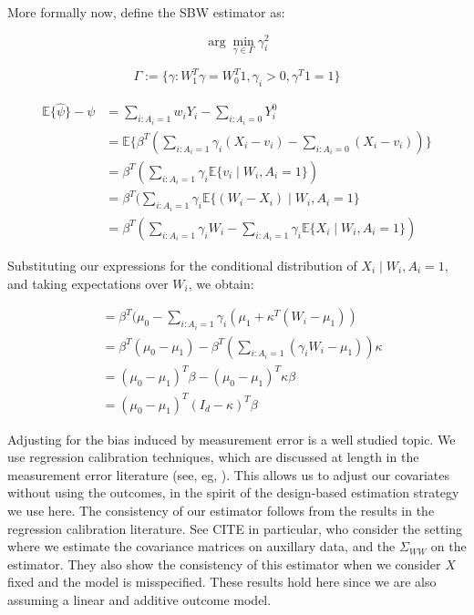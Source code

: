 \documentclass[12pt]{article}
\begin{document}
More formally now, define the SBW estimator as:

$$
\arg\min_{\gamma \in \Gamma} \gamma_i^2
$$

$$
\Gamma := \{\gamma: W_1^T\gamma = W_0^T1, \gamma_i > 0, \gamma^T1 = 1\}
$$

\begin{align*}
    \mathbb{E}\{\hat{\psi}\} - \psi &= \sum_{i: A_i = 1}w_iY_i - \sum_{i: A_i = 0}Y_i^0 \\
    &= \mathbb{E}\{\beta^T(\sum_{i: A_i = 1} \gamma_i (X_i - v_i) - \sum_{i: A_i = 0} (X_i - v_i))\} \\
    &= \beta^T(\sum_{i: A_i = 1} \gamma_i\mathbb{E}\{v_i \mid W_i, A_i = 1\}) \\
    &= \beta^T(\sum_{i: A_i = 1} \gamma_i\mathbb{E}\{(W_i - X_i) \mid W_i, A_i = 1\} \\
    &= \beta^T(\sum_{i: A_i = 1} \gamma_iW_i - \sum_{i: A_i = 1} \gamma_i\mathbb{E}\{X_i \mid W_i, A_i = 1\})
\end{align*}

Substituting our expressions for the conditional distribution of $X_i \mid W_i, A_i = 1$, and taking expectations over $W_i$, we obtain:

\begin{align*}
    &= \beta^T(\mu_0 - \sum_{i: A_i = 1} \gamma_i(\mu_1 + \kappa^T(W_i - \mu_1)) \\
    &= \beta^T(\mu_0 - \mu_1) - \beta^T(\sum_{i: A_i = 1}(\gamma_iW_i - \mu_1))\kappa \\
    &= (\mu_0 - \mu_1)^T\beta - (\mu_0 - \mu_1)^T\kappa\beta \\
    &= (\mu_0 - \mu_1)^T(I_d - \kappa)^T\beta
\end{align*}

Adjusting for the bias induced by measurement error is a well studied topic. We use regression calibration techniques, which are discussed at length in the measurement error literature (see, eg, \cite{carroll2006measurement}). This allows us to adjust our covariates without using the outcomes, in the spirit of the design-based estimation strategy we use here. The consistency of our estimator follows from the results in the regression calibration literature. See CITE in particular, who consider the setting where we estimate the covariance matrices on auxillary data, and the $\Sigma_{WW}$ on the estimator. They also show the consistency of this estimator when we consider $X$ fixed and the model is misspecified. These results hold here since we are also assuming a linear and additive outcome model.
\end{document}
